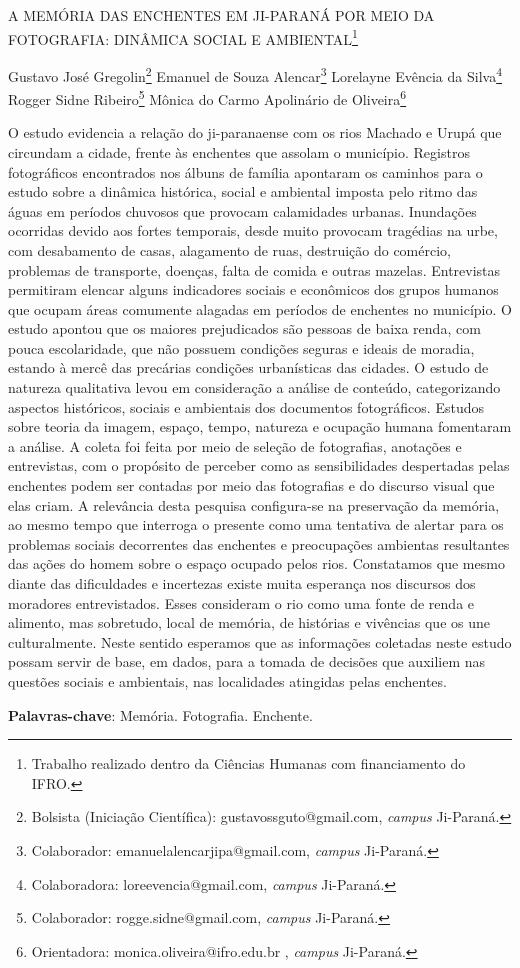 \documentclass[article,12pt,onesidea,4paper,english,brazil]{abntex2}
\begin{document}
	
	
	\frenchspacing 
	
	\begin{center}
		\LARGE A MEMÓRIA DAS ENCHENTES EM JI-PARANÁ POR MEIO DA FOTOGRAFIA: DINÂMICA SOCIAL E AMBIENTAL\footnote{Trabalho realizado dentro da Ciências Humanas com financiamento do IFRO.}
		
		\normalsize
		Gustavo José Gregolin\footnote{Bolsista (Iniciação Científica): gustavossguto@gmail.com, \textit{campus} Ji-Paraná.} 
		Emanuel de Souza Alencar\footnote{Colaborador: emanuelalencarjipa@gmail.com, \textit{campus} Ji-Paraná.} 
		Lorelayne Evência da Silva\footnote{Colaboradora: loreevencia@gmail.com, \textit{campus} Ji-Paraná.} 
		Rogger Sidne Ribeiro\footnote{Colaborador: rogge.sidne@gmail.com, \textit{campus} Ji-Paraná.}
		Mônica do Carmo Apolinário de Oliveira\footnote{Orientadora: monica.oliveira@ifro.edu.br , \textit{campus} Ji-Paraná.} 
	\end{center}
	
	\noindent O estudo evidencia a relação do ji-paranaense com os rios Machado e Urupá que
	circundam a cidade, frente às enchentes que assolam o município. Registros
	fotográficos encontrados nos álbuns de família apontaram os caminhos para o
	estudo sobre a dinâmica histórica, social e ambiental imposta pelo ritmo das águas
	em períodos chuvosos que provocam calamidades urbanas. Inundações ocorridas
	devido aos fortes temporais, desde muito provocam tragédias na urbe, com
	desabamento de casas, alagamento de ruas, destruição do comércio, problemas de
	transporte, doenças, falta de comida e outras mazelas. Entrevistas permitiram
	elencar alguns indicadores sociais e econômicos dos grupos humanos que ocupam
	áreas comumente alagadas em períodos de enchentes no município. O estudo
	apontou que os maiores prejudicados são pessoas de baixa renda, com pouca
	escolaridade, que não possuem condições seguras e ideais de moradia, estando à
	mercê das precárias condições urbanísticas das cidades. O estudo de natureza
	qualitativa levou em consideração a análise de conteúdo, categorizando aspectos
	históricos, sociais e ambientais dos documentos fotográficos. Estudos sobre teoria
	da imagem, espaço, tempo, natureza e ocupação humana fomentaram a análise. A
	coleta foi feita por meio de seleção de fotografias, anotações e entrevistas, com o
	propósito de perceber como as sensibilidades despertadas pelas enchentes podem
	ser contadas por meio das fotografias e do discurso visual que elas criam. A
	relevância desta pesquisa configura-se na preservação da memória, ao mesmo
	tempo que interroga o presente como uma tentativa de alertar para os problemas
	sociais decorrentes das enchentes e preocupações ambientas resultantes das ações
	do homem sobre o espaço ocupado pelos rios. Constatamos que mesmo diante das
	dificuldades e incertezas existe muita esperança nos discursos dos moradores
	entrevistados. Esses consideram o rio como uma fonte de renda e alimento, mas
	sobretudo, local de memória, de histórias e vivências que os une culturalmente.
	Neste sentido esperamos que as informações coletadas neste estudo possam servir
	de base, em dados, para a tomada de decisões que auxiliem nas questões sociais e
	ambientais, nas localidades atingidas pelas enchentes.
	
	\vspace{\onelineskip}
	
	\noindent
	\textbf{Palavras-chave}: Memória. Fotografia. Enchente.
	
\end{document}
